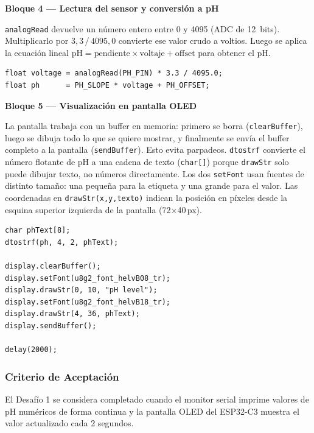 \documentclass[12pt,leqno]{article}
\begin{document}
\bigskip
\noindent\textbf{Bloque 4 --- Lectura del sensor y conversi\'on a pH}

\smallskip
\noindent \texttt{analogRead} devuelve un n\'umero entero entre 0 y 4095 (ADC de
12~bits). Multiplicarlo por $3{,}3\,/\,4095{,}0$ convierte ese valor crudo a
voltios. Luego se aplica la ecuaci\'on lineal $\mathrm{pH} = \mathrm{pendiente}
\times \mathrm{voltaje} + \mathrm{offset}$ para obtener el pH.

\begin{lstlisting}
float voltage = analogRead(PH_PIN) * 3.3 / 4095.0;
float ph      = PH_SLOPE * voltage + PH_OFFSET;
\end{lstlisting}

\bigskip
\noindent\textbf{Bloque 5 --- Visualizaci\'on en pantalla OLED}

\smallskip
\noindent La pantalla trabaja con un buffer en memoria: primero se borra
(\texttt{clearBuffer}), luego se dibuja todo lo que se quiere mostrar, y finalmente
se env\'ia el buffer completo a la pantalla (\texttt{sendBuffer}). Esto evita
parpadeos. \texttt{dtostrf} convierte el n\'umero flotante de pH a una cadena de
texto (\texttt{char[]}) porque \texttt{drawStr} solo puede dibujar texto, no
n\'umeros directamente. Los dos \texttt{setFont} usan fuentes de distinto tama\~no:
una peque\~na para la etiqueta y una grande para el valor. Las coordenadas en
\texttt{drawStr(x,y,texto)} indican la posici\'on en p\'ixeles desde la esquina
superior izquierda de la pantalla (72$\times$40\,px).

\begin{lstlisting}
char phText[8];
dtostrf(ph, 4, 2, phText);

display.clearBuffer();
display.setFont(u8g2_font_helvB08_tr);
display.drawStr(0, 10, "pH level");
display.setFont(u8g2_font_helvB18_tr);
display.drawStr(4, 36, phText);
display.sendBuffer();

delay(2000);
\end{lstlisting}

\subsubsection*{Criterio de Aceptaci\'on}

El Desaf\'io 1 se considera completado cuando el monitor serial imprime valores de
pH num\'ericos de forma continua y la pantalla OLED del ESP32-C3 muestra el valor
actualizado cada 2 segundos.

\newpage
\end{document}
